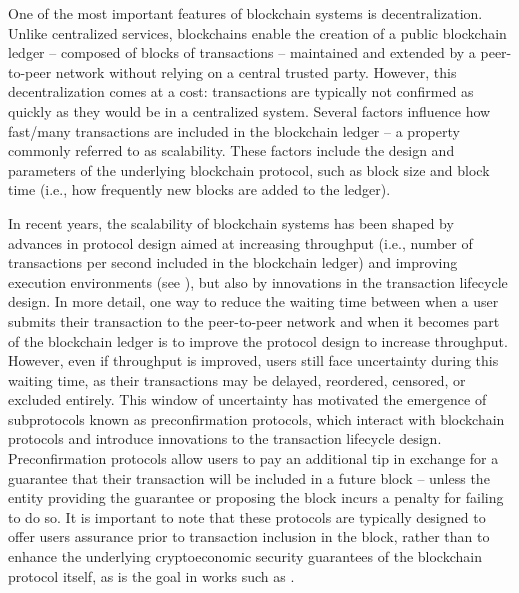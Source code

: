 \documentclass[a4paper]{article}
\theoremstyle{boldstyle}
\begin{document}
\iffalse
One of the most important features of blockchain systems is decentralization. Unlike centralized services, blockchains enable the creation of a public blockchain ledger -- composed of blocks of transactions -- maintained and extended by a peer-to-peer network without relying on a central trusted party. However, this decentralization comes at a cost: transactions are typically not confirmed as quickly as they would be in a centralized system.
Several factors influence how fast/many transactions are included in the blockchain ledger -- a property commonly referred to as scalability. These factors include the design and parameters of the underlying blockchain protocol, such as block size and block time (i.e., how frequently new blocks are added to the ledger). \par  In recent years, the scalability of blockchain systems has been shaped by advances in protocol design aimed at increasing throughput (i.e., number of transactions per second included in the blockchain ledger) and improving execution environments (see \cite{cryptoeprint:2018/1119, che2025manifoldchain, Fitzi2020ProofofStakeBP, neiheiser2025anthemiusefficientmodular, ethereum_scaling}), but also by innovations in the transaction lifecycle design. 
In more detail, one way to reduce the waiting time between when a user submits their transaction to the peer-to-peer network and when it becomes part of the blockchain ledger is to improve the protocol design to increase throughput. However, even if throughput is improved, users still face uncertainty during this waiting time, as their transactions may be delayed, reordered, censored, or excluded entirely. This window of uncertainty has motivated the emergence of subprotocols known as preconfirmation protocols, which interact with blockchain protocols and introduce innovations to the transaction lifecycle design. Preconfirmation protocols allow users to pay an additional tip in exchange for a guarantee that their transaction will be included in a future block -- unless the entity providing the guarantee or proposing the block incurs a penalty for failing to do so. It is important to note that these protocols are typically designed to offer users assurance prior to transaction inclusion in the block, rather than to enhance the underlying cryptoeconomic security guarantees of the blockchain protocol itself, as is the goal in works such as \cite{deb2024stakesureproofstakemechanisms}. 
\end{document}
